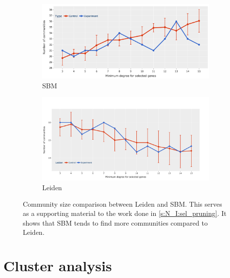 \begin{figure}[!h]
    \centering
    \begin{subfigure}[!t]{1.0\textwidth}
        \includegraphics[width=\textwidth]{Sections/Network_I/Resources/selective_pruning/com_comp/sbm_comNum_sel_prun.png}
        \caption{SBM}
        \label{fig:ap:sbm_com_size}
    \end{subfigure} 
    \begin{subfigure}[!t]{1.0\textwidth}
        \includegraphics[width=\linewidth]{Sections/Network_I/Resources/selective_pruning/leid_comNum_sel_prun.png}
        \caption{Leiden}
        \label{fig:ap:leid_com_size}
    \end{subfigure}\hspace{\fill}  
    \caption{Community size comparison between Leiden and SBM. This serves as a supporting material to the work done in \cref{s:N_I:sel_pruning}. It shows that SBM tends to find more communities compared to Leiden.}
    \label{fig:ap:com_size_comp}
\end{figure}

\section{Cluster analysis} \label{s:ap:sel_tfs_cs}

